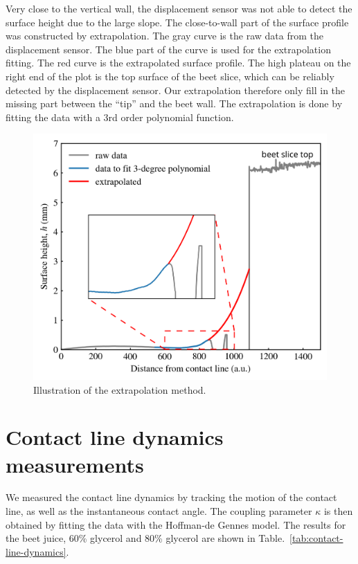 \documentclass[aps,preprint]{revtex4-2}
\begin{document}
Very close to the vertical wall, the displacement sensor was not able to detect the surface height due to the large slope.
The close-to-wall part of the surface profile was constructed by extrapolation.
The gray curve is the raw data from the displacement sensor. 
The blue part of the curve is used for the extrapolation fitting. The red curve is the extrapolated surface profile. 
The high plateau on the right end of the plot is the top surface of the beet slice, which can be reliably detected by the displacement sensor. 
Our extrapolation therefore only fill in the missing part between the ``tip'' and the beet wall. 
The extrapolation is done by fitting the data with a 3rd order polynomial function.

\begin{figure}[ht]
    \centering
    \includegraphics[width=\textwidth]{Figures/extrapolation_illustration.png}
    \caption{
    Illustration of the extrapolation method. 
    }
    \label{fig:extrapolation}
\end{figure}

\newpage

\section{Contact line dynamics measurements}

We measured the contact line dynamics by tracking the motion of the contact line, as well as the instantaneous contact angle. 
The coupling parameter $\kappa$ is then obtained by fitting the data with the Hoffman-de Gennes model. 
The results for the beet juice, 60\% glycerol and 80\% glycerol are shown in Table.~\ref{tab:contact-line-dynamics}.
\end{document}
